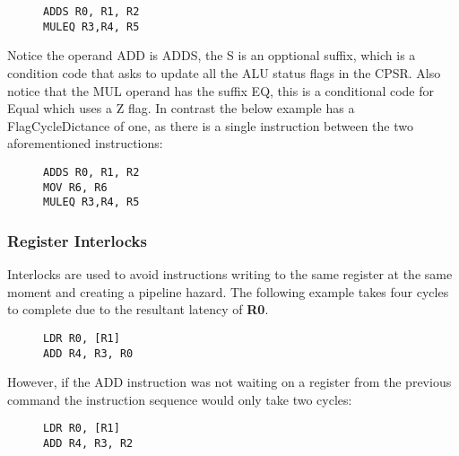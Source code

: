 \documentclass[11pt]{report}
\begin{document}
\begin{figure}[H]
\begin{verbatim}
ADDS R0, R1, R2
MULEQ R3,R4, R5
\end{verbatim}
\end{figure}
\begin{onehalfspace}
Notice the operand ADD is ADDS, the S is an opptional suffix, which is a condition code that asks to update all the ALU status flags in the CPSR. Also notice that the MUL operand has the suffix EQ, this is a conditional code for Equal which uses a Z flag. In contrast the below example has a FlagCycleDictance of one, as there is a single instruction between the two aforementioned instructions:
\end{onehalfspace}
\begin{figure}[H]
\begin{verbatim}
ADDS R0, R1, R2
MOV R6, R6
MULEQ R3,R4, R5
\end{verbatim}
\end{figure}
\subsubsection{Register Interlocks}
\begin{onehalfspace}
Interlocks are used to avoid instructions writing to the same register at the same moment and creating a pipeline hazard. The following example takes four cycles~\citep[16-6]{arm1176jzf-s} to complete due to the resultant latency of \textbf{R0}. 
\end{onehalfspace}
\begin{figure}[H]
\begin{verbatim}
LDR R0, [R1]
ADD R4, R3, R0
\end{verbatim}
\end{figure}
\begin{onehalfspace}
However, if the ADD instruction was not waiting on a register from the previous command the instruction sequence would only take two cycles:
\end{onehalfspace}
\begin{figure}[H]
\begin{verbatim}
LDR R0, [R1]
ADD R4, R3, R2

\end{verbatim}
\end{figure}
\end{document}
